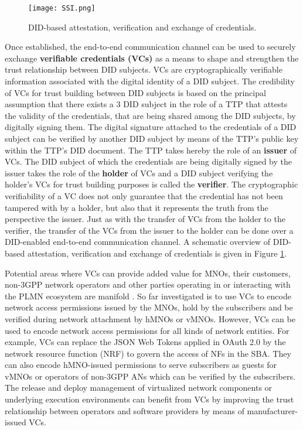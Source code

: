 \documentclass[conference]{IEEEtran}
\begin{document}
\begin{figure}[tp]
	\centerline{\texttt{[image: SSI.png]}}
	\caption{DID-based attestation, verification and exchange of credentials.}
	\label{fig_SSI}
\end{figure} 


Once established, the end-to-end communication channel can be used to securely exchange {\bf{verifiable credentials (VCs)}} \cite{WorldWideWebConsortium.05.11.2021} as a means to shape and strengthen the trust relationship between DID subjects. VCs are cryptographically verifiable information associated with the digital identity of a DID subject. The credibility of VCs for trust building between DID subjects is based on the principal assumption that there exists a 3 DID subject in the role of a TTP that attests the validity of the credentials, that are being shared among the DID subjects, by digitally signing them. The digital signature attached to the credentials of a DID subject can be verified by another DID subject by means of the TTP's public key within the TTP's DID document. The TTP takes hereby the role of an {\bf{issuer}} of VCs. The DID subject of which the credentials are being digitally signed by the issuer takes the role of the {\bf{holder}} of VCs and a DID subject verifying the holder's VCs for trust building purposes is called the {\bf{verifier}}. The cryptographic verifiability of a VC does not only guarantee that the credential has not been tampered with by a holder, but also that it represents the truth from the perspective the issuer. Just as with the transfer of VCs from the holder to the verifier, the transfer of the VCs from the issuer to the holder can be done over a DID-enabled end-to-end communication channel. A schematic overview of DID-based attestation, verification and exchange of credentials is given in Figure \ref{fig_SSI}. 

Potential areas where VCs can provide added value for MNOs, their customers, non-3GPP network operators and other parties operating in or interacting with the PLMN ecosystem are manifold \cite{RodriguezGarzon.2022}. So far investigated is to use VCs to encode network access permissions issued by the MNOs, hold by the subscribers and be verified during network attachment by hMNOs or vMNOs. However, VCs can be used to encode network access permissions for all kinds of network entities. For example, VCs can replace the JSON Web Tokens applied in OAuth 2.0 by the network resource function (NRF) to govern the access of NFs in the SBA. They can also encode hMNO-issued permissions to serve subscribers as guests for vMNOs or operators of non-3GPP ANs which can be verified by the subscribers. The release and deploy management of virtualized network components or underlying execution environments can benefit from VCs by improving the trust relationship between operators and software providers by means of manufacturer-issued VCs. 
\end{document}

